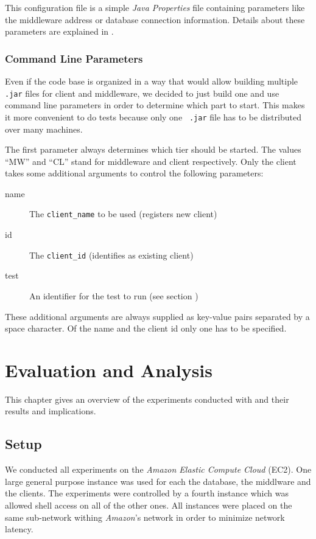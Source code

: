 \documentclass[a4paper, oneside]{csthesis}
\begin{document}
    This configuration file is a simple {\it Java Properties}
    file containing parameters like the middleware address or database
    connection information. Details about these parameters are explained in
    .

\subsection{Command Line Parameters}
    Even if the code base is organized in a way that would allow building
    multiple {\tt .jar} files for client and middleware, we decided to just
    build one and use command line parameters in order to determine which part
    to start. This makes it more convenient to do tests because only one {\tt
    .jar} file has to be distributed over many machines.
   
    The first parameter always determines which tier should be started. The
    values ``MW'' and ``CL'' stand for middleware and client respectively.
    Only the client takes some additional arguments to control the following
    parameters:
    
    \begin{description}
    \item[name] The {\tt client\_name} to be used (registers new client)
    \item[id] The {\tt client\_id} (identifies as existing client)
    \item[test] An identifier for the test to run (see section )
    \end{description}

    These additional arguments are always supplied as key-value pairs separated
    by a space character. Of the name and the client id only one has to be
    specified.

\chapter{Evaluation and Analysis}
\label{ch:evaluation}
	This chapter gives an overview of the experiments conducted with \telesto{} and
	their results and implications.

\section{Setup}
	We conducted all experiments on the {\it Amazon Elastic Compute Cloud} (EC2).
    One large general purpose instance was used for each the database, the middlware and the clients.
    The experiments were controlled by a fourth instance which was allowed shell access on all of the
    other ones. All instances were placed on the same sub-network withing {\it Amazon}'s network in order
    to minimize network latency.
    
\end{document}
